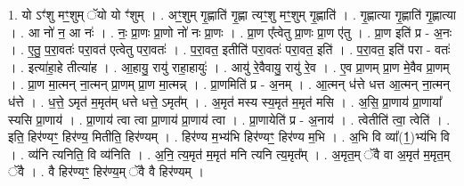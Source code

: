\documentclass[17pt]{extarticle}
\begin{document}
1. यो ऽꣳ॑शु मꣳ॒॒शुम् ॅयो यो ꣳ॑शुम् । . अꣳ॒॒शुम् गृ॒ह्णाति॑ गृ॒ह्णा त्यꣳ॒॒शु मꣳ॒॒शुम् गृ॒ह्णाति॑ । . गृ॒ह्णात्या गृ॒ह्णाति॑ गृ॒ह्णात्या । . आ नो॑ न॒ आ नः॑ । . नः॒ प्रा॒णः प्रा॒णो नो॑ नः प्रा॒णः । . प्रा॒ण ए᳚त्वेतु प्रा॒णः प्रा॒ण ए॑तु । . प्रा॒ण इति॑ प्र - अ॒नः । . ए॒तु॒ प॒रा॒वतः॑ परा॒वत॑ एत्वेतु परा॒वतः॑ । . प॒रा॒वत॒ इतीति॑ परा॒वतः॑ परा॒वत॒ इति॑ । . प॒रा॒वत॒ इति॑ परा - वतः॑ । . इत्या॑हा॒हे तीत्या॑ह । . आ॒हायु॒ रायु॑ राहा॒हायुः॑ । . आयु॑ रे॒वैवायु॒ रायु॑ रे॒व । . ए॒व प्रा॒णम् प्रा॒ण मे॒वैव प्रा॒णम् । . प्रा॒ण मा॒त्मन् ना॒त्मन् प्रा॒णम् प्रा॒ण मा॒त्मन्न् । . प्रा॒णमिति॑ प्र - अ॒नम् । . आ॒त्मन् ध॑त्ते धत्त आ॒त्मन् ना॒त्मन् ध॑त्ते । . ध॒त्ते॒ ऽमृत॑ म॒मृत॑म् धत्ते धत्ते॒ ऽमृत᳚म् । . अ॒मृत॑ मस्य स्य॒मृत॑ म॒मृत॑ मसि । . अ॒सि॒ प्रा॒णाय॑ प्रा॒णाया᳚ स्यसि प्रा॒णाय॑ । . प्रा॒णाय॑ त्वा त्वा प्रा॒णाय॑ प्रा॒णाय॑ त्वा । . प्रा॒णायेति॑ प्र - अ॒नाय॑ । . त्वेतीति॑ त्वा॒ त्वेति॑ । . इति॒ हिर॑ण्यꣳ॒॒ हिर॑ण्य॒ मितीति॒ हिर॑ण्यम् । . हिर॑ण्य म॒भ्य॑भि हिर॑ण्यꣳ॒॒ हिर॑ण्य म॒भि । . अ॒भि वि व्या᳚(1॒)भ्य॑भि वि । . व्य॑नि त्यनिति॒ वि व्य॑निति । . अ॒नि॒ त्य॒मृत॑ म॒मृत॑ मनि त्यनि त्य॒मृत᳚म् । . अ॒मृत॒म् ॅवै वा अ॒मृत॑ म॒मृत॒म् ॅवै । . वै हिर॑ण्यꣳ॒॒ हिर॑ण्य॒म् ॅवै वै हिर॑ण्यम् । \newline
\end{document}

